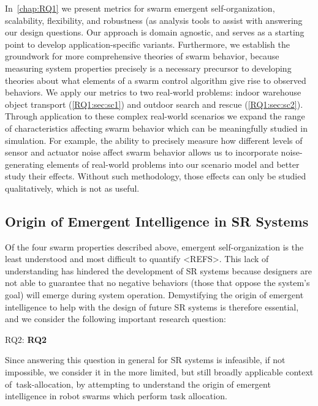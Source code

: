 \noindent
In~\cref{chap:RQ1} we present metrics for swarm emergent self-organization,
scalability, flexibility, and robustness (as analysis tools to assist with
answering our design questions. Our approach is domain agnostic, and serves as a
starting point to develop application-specific variants. Furthermore, we
establish the groundwork for more comprehensive theories of swarm behavior,
because measuring system properties precisely is a necessary precursor to
developing theories about what elements of a swarm control algorithm give rise
to observed behaviors. We apply our metrics to two real-world problems: indoor
warehouse object transport (\cref{RQ1:sec:sc1}) and outdoor search and rescue
(\cref{RQ1:sec:sc2}).  Through application to these complex real-world scenarios
we expand the range of characteristics affecting swarm behavior which can be
meaningfully studied in simulation. For example, the ability to precisely
measure how different levels of sensor and actuator noise affect swarm behavior
allows us to incorporate noise-generating elements of real-world problems into
our scenario model and better study their effects. Without such methodology,
those effects can only be studied qualitatively, which is not as useful.

\subsection{Origin of Emergent Intelligence in SR Systems}
%
Of the four swarm properties described above, emergent self-organization is the
least understood and most difficult to quantify <REFS>. This lack of
understanding has hindered the development of SR systems because
designers are not able to guarantee that no negative behaviors (those that
oppose the system's goal) will emerge during system operation. Demystifying the
origin of emergent intelligence to help with the design of future SR
systems is therefore essential, and we consider the following important research
question:

\medskip\noindent
\gls{RQ2}: \textbf{\Glsdesc{RQ2}}
\medskip

\noindent
Since answering this question in general for SR systems is infeasible, if
not impossible, we consider it in the more limited, but still broadly applicable
context of~\gls{task-allocation}, by attempting to understand the origin of
emergent intelligence in robot swarms which perform task allocation.

